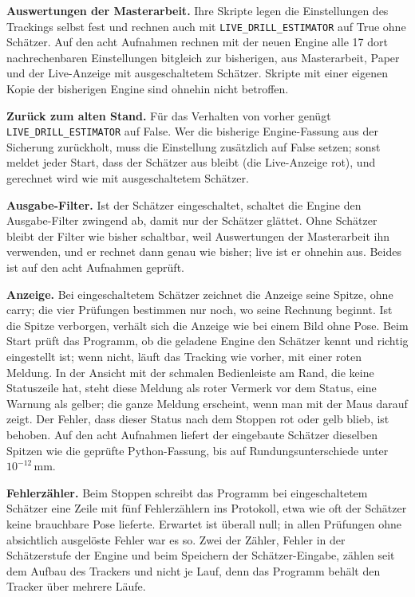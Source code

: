 \documentclass[11pt,a4paper,fleqn]{article}
\begin{document}
\textbf{Auswertungen der Masterarbeit.} Ihre Skripte legen die Einstellungen des Trackings selbst fest und rechnen
auch mit \texttt{LIVE\_DRILL\_ESTIMATOR} auf True ohne Schätzer. Auf den acht Aufnahmen rechnen mit der neuen Engine
alle 17 dort nachrechenbaren Einstellungen bitgleich zur bisherigen, aus Masterarbeit, Paper und der Live-Anzeige mit
ausgeschaltetem Schätzer.
Skripte mit einer eigenen Kopie der bisherigen Engine sind ohnehin nicht betroffen.

\textbf{Zurück zum alten Stand.} Für das Verhalten von vorher genügt \texttt{LIVE\_DRILL\_ESTIMATOR} auf False. Wer
die bisherige Engine-Fassung aus der Sicherung zurückholt, muss die Einstellung zusätzlich auf False setzen; sonst
meldet jeder Start, dass der Schätzer aus bleibt (die Live-Anzeige rot), und gerechnet wird wie mit ausgeschaltetem
Schätzer.

\textbf{Ausgabe-Filter.} Ist der Schätzer eingeschaltet, schaltet die Engine den Ausgabe-Filter zwingend ab, damit nur
der Schätzer glättet. Ohne Schätzer bleibt der Filter wie bisher schaltbar, weil Auswertungen der Masterarbeit ihn
verwenden, und er rechnet dann genau wie bisher; live ist er ohnehin aus. Beides ist auf den acht Aufnahmen geprüft.

\textbf{Anzeige.} Bei eingeschaltetem Schätzer zeichnet die Anzeige seine Spitze, ohne carry; die vier Prüfungen
bestimmen nur noch, wo seine Rechnung beginnt. Ist die Spitze verborgen, verhält sich die Anzeige wie bei einem Bild
ohne Pose. Beim Start prüft das Programm, ob die geladene Engine den Schätzer kennt und richtig eingestellt ist; wenn
nicht, läuft das Tracking wie vorher, mit einer roten Meldung. In der Ansicht mit der schmalen Bedienleiste am Rand,
die keine Statuszeile hat, steht diese Meldung als roter Vermerk vor dem Status, eine Warnung als gelber; die ganze
Meldung erscheint, wenn man mit der Maus darauf zeigt. Der Fehler, dass dieser Status nach dem Stoppen rot oder gelb
blieb, ist behoben. Auf den acht Aufnahmen liefert der eingebaute Schätzer dieselben Spitzen wie die geprüfte
Python-Fassung, bis auf Rundungsunterschiede unter $10^{-12}$\,mm.

\textbf{Fehlerzähler.} Beim Stoppen schreibt das Programm bei eingeschaltetem Schätzer eine Zeile mit fünf
Fehlerzählern ins Protokoll, etwa wie oft der Schätzer keine brauchbare Pose lieferte. Erwartet ist überall null; in
allen Prüfungen ohne absichtlich ausgelöste Fehler war es so. Zwei der Zähler, Fehler in der Schätzerstufe der Engine
und beim Speichern der
Schätzer-Eingabe, zählen seit dem Aufbau des Trackers und nicht je Lauf, denn das Programm behält den Tracker über
mehrere Läufe.
\end{document}
